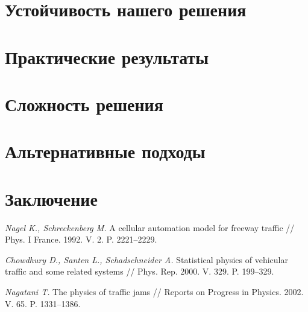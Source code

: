 \documentclass[12pt, a4paper]{article}
\begin{document}
\newpage
\section*{Устойчивость нашего решения}



\newpage
\section*{Практические результаты}


\newpage
\section*{Сложность решения}

\newpage
\section*{Альтернативные подходы}

\newpage
\section*{Заключение}

    \newpage
\begin{thebibliography}{0}
	
	
	 \textit{Nagel K., Schreckenberg M.} A cellular automation model for freeway
	traffic // Phys. I France. 1992. V. 2. P. 2221–2229.
	
	 \textit{Chowdhury D., Santen L., Schadschneider A.} Statistical physics of vehicular
	traffic and some related systems // Phys. Rep. 2000. V. 329.
	P. 199–329.
	
	 \textit{Nagatani T.} The physics of traffic jams // Reports on Progress in Physics.
	2002. V. 65. P. 1331–1386.
	
\end{thebibliography} 
\end{document}
